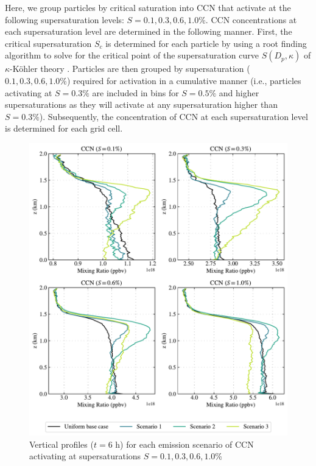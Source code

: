 Here, we group particles by critical saturation into CCN that activate at the following supersaturation levels:  $S=0.1, 0.3, 0.6, 1.0\%$. CCN concentrations at each supersaturation level are determined in the following manner. First, the critical supersaturation $S_c$ is determined for each particle by using a root finding algorithm to solve for the critical point of the supersaturation curve $S(D_p, \kappa)$ of $\kappa$-Köhler theory \parencite{petters_single_2007}. Particles are then grouped by supersaturation ($0.1, 0.3, 0.6, 1.0\%$) required for activation in a cumulative manner (i.e., particles activating at $S=0.3\%$ are included in bins for $S=0.5\%$ and higher supersaturations as they will activate at any supersaturation higher than $S=0.3\%$). Subsequently, the concentration of CCN at each supersaturation level is determined for each grid cell. 

\begin{figure}[!t]
  \centering
    \includegraphics[width=.9\textwidth]{figures/chapter5/aerosol-ccn-vertical-profiles-time36.pdf}
    \caption{Vertical profiles ($t=6$ h) for each emission scenario of CCN activating at supersaturations $S=0.1, 0.3, 0.6, 1.0$\%}
    \label{fig:vertprof-ccn}
\end{figure}

